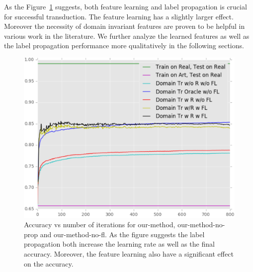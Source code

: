 As the Figure~\ref{fllprop} suggests, both feature learning and label propagation is crucial for successful transduction. The feature learning has a slightly larger effect. Moreover the necessity of domain invariant features are proven to be helpful in various work\cite{ganin15, tzeng14} in the literature. We further analyze the learned features as well as the label propagation performance more qualitatively in the following sections.

\begin{figure}[ht]
\includegraphics[width=\columnwidth]{figure_1fl}
\caption{Accuracy vs number of iterations for our-method, our-method-no-prop and our-method-no-fl. As the figure suggests the label propagation both increase the learning rate as well as the final accuracy. Moreover, the feature learning also have a significant effect on the accuracy.}
\label{fllprop}
\end{figure}

